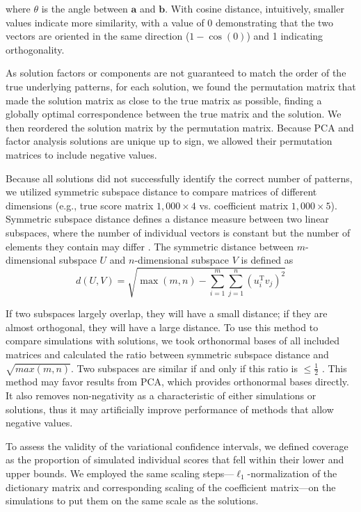 where $\theta$ is the angle between $\mathbf{a}$ and $\mathbf{b}$. With cosine distance, intuitively, smaller values indicate more similarity, with a value of 0 demonstrating that the two vectors are oriented in the same direction ($1 - \cos(0)$) and 1 indicating orthogonality.

As solution factors or components are not guaranteed to match the order of the true underlying patterns, for each solution, we found the permutation matrix that made the solution matrix as close to the true matrix as possible, finding a globally optimal correspondence between the true matrix and the solution. We then reordered the solution matrix by the permutation matrix. Because PCA and factor analysis solutions are unique up to sign, we allowed their permutation matrices to include negative values.

Because all solutions did not successfully identify the correct number of patterns, we utilized symmetric subspace distance to compare  matrices of different dimensions (e.g., true score matrix $1,000 \times 4$ vs. coefficient matrix $1,000 \times 5$). Symmetric subspace distance defines a distance measure between two linear subspaces, where the number of individual vectors is constant but the number of elements they contain may differ \citep{wang2006subspace}. The symmetric distance between $m$-dimensional subspace $U$ and $n$-dimensional subspace $V$ is defined as 
\begin{equation}
d(U, V) =\sqrt{\max (m, n)-\sum_{i=1}^{m} \sum_{j=1}^{n}\left(u_{i}^{\mathrm{T}} v_{j}\right)^{2}}
\end{equation}

If two subspaces largely overlap, they will have a small distance; if they are almost orthogonal, they will have a large distance. To use this method to compare simulations with solutions, we took orthonormal bases of all included matrices and calculated the ratio between symmetric subspace distance and $\sqrt{max(m,n)}$. Two subspaces are similar if and only if this ratio is $\leq \frac{1}{2}$ \citep{wang2006subspace}. This method may favor results from PCA, which provides orthonormal bases directly. It also removes non-negativity as a characteristic of either simulations or solutions, thus it may artificially improve performance of methods that allow negative values.

To assess the validity of the variational confidence intervals, we defined coverage as the proportion of simulated individual scores that fell within their lower and upper bounds. We employed the same scaling steps---$\ell_1$-normalization of the dictionary matrix and corresponding scaling of the coefficient matrix---on the simulations to put them on the same scale as the solutions.

